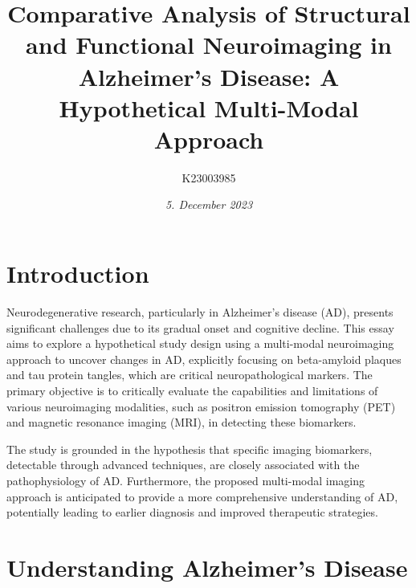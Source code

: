 \documentclass[10pt]{article}
\title{\textbf{Comparative Analysis of Structural and Functional Neuroimaging in Alzheimer's Disease: }A Hypothetical Multi-Modal Approach}
\author[ ]{K23003985}
\date{\textit{5. December 2023}}
\begin{document}

\maketitle

\doublespacing

\begin{sloppypar} %





  \section{Introduction}
  \label{sec:introduction}

  Neurodegenerative research, particularly in Alzheimer's disease (AD), presents significant challenges due to its gradual onset and cognitive decline. This essay aims to explore a hypothetical study design using a multi-modal neuroimaging approach to uncover changes in AD, explicitly focusing on beta-amyloid plaques and tau protein tangles, which are critical neuropathological markers. The primary objective is to critically evaluate the capabilities and limitations of various neuroimaging modalities, such as positron emission tomography (PET) and magnetic resonance imaging (MRI), in detecting these biomarkers.

  The study is grounded in the hypothesis that specific imaging biomarkers, detectable through advanced techniques, are closely associated with the pathophysiology of AD. Furthermore, the proposed multi-modal imaging approach is anticipated to provide a more comprehensive understanding of AD, potentially leading to earlier diagnosis and improved therapeutic strategies.

  \section{Understanding Alzheimer's Disease}
  \label{sec:alzheimers-disease}


\end{sloppypar}
\end{document}
